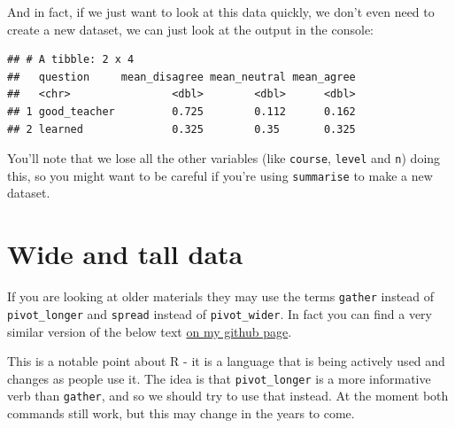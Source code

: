 \documentclass[
]{book}
\newenvironment{Shaded}{\begin{snugshade}}{\end{snugshade}}
\newcommand{\DataTypeTok}[1]{\textcolor[rgb]{0.13,0.29,0.53}{#1}}
\newcommand{\KeywordTok}[1]{\textcolor[rgb]{0.13,0.29,0.53}{\textbf{#1}}}
\newcommand{\NormalTok}[1]{#1}
\newcommand{\OperatorTok}[1]{\textcolor[rgb]{0.81,0.36,0.00}{\textbf{#1}}}
\newcommand{\StringTok}[1]{\textcolor[rgb]{0.31,0.60,0.02}{#1}}
\begin{document}
And in fact, if we just want to look at this data quickly, we don't even need to create a new dataset, we can just look at the output in the console:

\begin{Shaded}
\end{Shaded}

\begin{verbatim}
## # A tibble: 2 x 4
##   question     mean_disagree mean_neutral mean_agree
##   <chr>                <dbl>        <dbl>      <dbl>
## 1 good_teacher         0.725        0.112      0.162
## 2 learned              0.325        0.35       0.325
\end{verbatim}

You'll note that we lose all the other variables (like \texttt{course}, \texttt{level} and \texttt{n}) doing this, so you might want to be careful if you're using \texttt{summarise} to make a new dataset.

\hypertarget{pivoting_data}{%
\section{Wide and tall data}\label{pivoting_data}}

\begin{hey}
If you are looking at older materials they may use the terms
\texttt{gather} instead of \texttt{pivot\_longer} and \texttt{spread}
instead of \texttt{pivot\_wider}. In fact you can find a very similar
version of the below text
\href{https://rawgit.com/jillymackay/RConversations/master/WideandTall.html}{on
my github page}.

This is a notable point about R - it is a language that is being
actively used and changes as people use it. The idea is that
\texttt{pivot\_longer} is a more informative verb than \texttt{gather},
and so we should try to use that instead. At the moment both commands
still work, but this may change in the years to come.
\end{hey}
\end{document}
